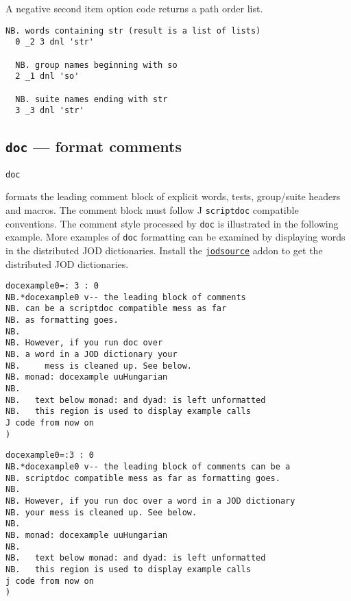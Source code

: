  A negative second item option code returns a path order list.

\begin{lstlisting}[frame=single,framerule=0pt] 
  NB. words containing str (result is a list of lists)
  0 _2 3 dnl 'str' 
  
  NB. group names beginning with so
  2 _1 dnl 'so'   
  
  NB. suite names ending with str 
  3 _3 dnl 'str'   
\end{lstlisting}

\subsection{\texttt{doc} --- format comments}\label{ss:doc}

\hypertarget{il:doc}{\texttt{doc}} formats the leading comment block 
of explicit words, tests, group/suite headers and macros.  The comment block must follow J
 \texttt{scriptdoc} compatible conventions.  The comment style processed by \texttt{doc} is 
illustrated in the following example. More examples of \texttt{doc} 
formatting can be examined by displaying 
words in the distributed JOD dictionaries. 
Install the \href{https://www.jsoftware.com/jwiki/Addons/general/jodsource}{\texttt{jodsource}} 
addon to get the distributed JOD dictionaries.

\begin{lstlisting}[frame=single,framerule=0pt]
docexample0=: 3 : 0
NB.*docexample0 v-- the leading block of comments
NB. can be a scriptdoc compatible mess as far
NB. as formatting goes.
NB.
NB. However, if you run doc over
NB. a word in a JOD dictionary your 
NB.     mess is cleaned up. See below.
NB. monad: docexample uuHungarian
NB.
NB.   text below monad: and dyad: is left unformatted
NB.   this region is used to display example calls
J code from now on
) 
\end{lstlisting}

\begin{lstlisting}[frame=single,framerule=0pt]
docexample0=:3 : 0
NB.*docexample0 v-- the leading block of comments can be a
NB. scriptdoc compatible mess as far as formatting goes.
NB.
NB. However, if you run doc over a word in a JOD dictionary
NB. your mess is cleaned up. See below.
NB.
NB. monad: docexample uuHungarian
NB.
NB.   text below monad: and dyad: is left unformatted
NB.   this region is used to display example calls
j code from now on
) 
\end{lstlisting}

